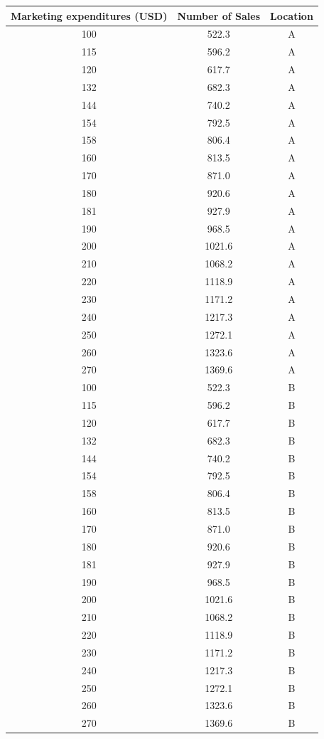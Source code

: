 \documentclass[
  letterpaper,
  DIV=11,
  numbers=noendperiod]{scrreprt}
\begin{document}
\begin{tabular}{c|c|c}
\hline
Marketing expenditures (USD) & Number of Sales & Location\\
\hline
100 & 522.3 & A\\
\hline
115 & 596.2 & A\\
\hline
120 & 617.7 & A\\
\hline
132 & 682.3 & A\\
\hline
144 & 740.2 & A\\
\hline
154 & 792.5 & A\\
\hline
158 & 806.4 & A\\
\hline
160 & 813.5 & A\\
\hline
170 & 871.0 & A\\
\hline
180 & 920.6 & A\\
\hline
181 & 927.9 & A\\
\hline
190 & 968.5 & A\\
\hline
200 & 1021.6 & A\\
\hline
210 & 1068.2 & A\\
\hline
220 & 1118.9 & A\\
\hline
230 & 1171.2 & A\\
\hline
240 & 1217.3 & A\\
\hline
250 & 1272.1 & A\\
\hline
260 & 1323.6 & A\\
\hline
270 & 1369.6 & A\\
\hline
100 & 522.3 & B\\
\hline
115 & 596.2 & B\\
\hline
120 & 617.7 & B\\
\hline
132 & 682.3 & B\\
\hline
144 & 740.2 & B\\
\hline
154 & 792.5 & B\\
\hline
158 & 806.4 & B\\
\hline
160 & 813.5 & B\\
\hline
170 & 871.0 & B\\
\hline
180 & 920.6 & B\\
\hline
181 & 927.9 & B\\
\hline
190 & 968.5 & B\\
\hline
200 & 1021.6 & B\\
\hline
210 & 1068.2 & B\\
\hline
220 & 1118.9 & B\\
\hline
230 & 1171.2 & B\\
\hline
240 & 1217.3 & B\\
\hline
250 & 1272.1 & B\\
\hline
260 & 1323.6 & B\\
\hline
270 & 1369.6 & B\\
\hline
\end{tabular}
\end{document}
